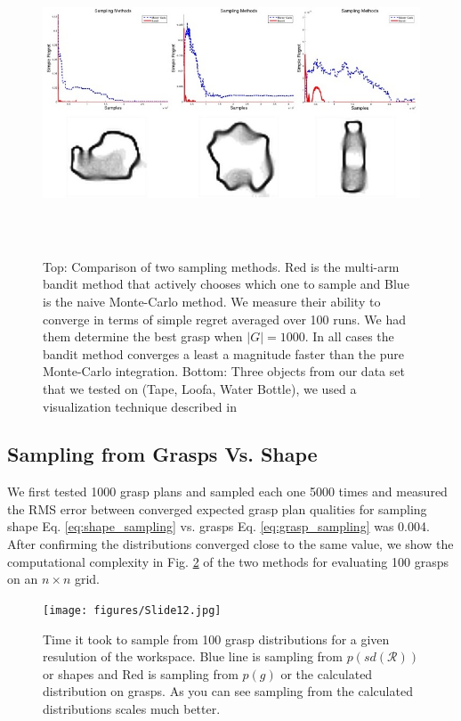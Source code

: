 \documentclass[letterpaper, 10 pt, conference]{ieeeconf}  %
\begin{document}
\begin{figure}[ht!]
\centering
\includegraphics[width = 16.5cm, height = 9cm]{figures/Slide09.jpg}
\caption{ \footnotesize Top: Comparison of two sampling methods. Red is the multi-arm bandit method that actively chooses which one to sample and Blue is the naive Monte-Carlo method. We measure their ability to converge in terms of simple regret averaged over 100 runs. We had them determine the best grasp when $|G|=1000$. In all cases the bandit method converges a least a magnitude faster than the pure Monte-Carlo integration. Bottom: Three objects from our data set that we tested on (Tape, Loofa, Water Bottle), we used a visualization technique described in \cite{mahler2015opt}}
\vspace*{-10pt}
\label{fig:simple_regret}
\end{figure}


\subsection{Sampling from Grasps Vs. Shape}
We first tested 1000 grasp plans and sampled each one 5000 times  and measured the RMS error between converged expected grasp plan qualities for sampling shape Eq. \ref{eq:shape_sampling} vs. grasps  Eq. \ref{eq:grasp_sampling} was 0.004. After confirming the distributions converged close to the same value, we show the computational complexity in Fig. \ref{fig:speed_dif} of the two methods for evaluating 100 grasps on an $n \times n$ grid. 



\begin{figure}[ht!]
\centering
\texttt{[image: figures/Slide12.jpg]}
\caption{ \footnotesize Time it took to sample from 100 grasp distributions for a given resulution of the workspace. Blue line is sampling from $p(sd(\mathcal{R}))$ or shapes and Red is sampling from $p(g)$ or the calculated distribution on grasps. As you can see sampling from the calculated distributions scales much better. }
\vspace*{-10pt}
\label{fig:speed_dif}
\end{figure}
\end{document}
